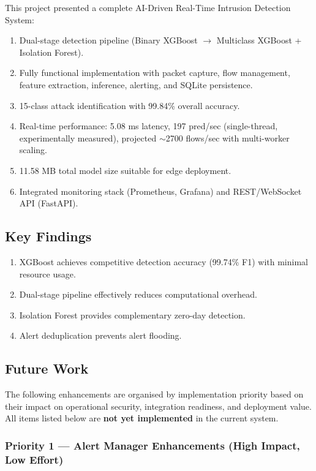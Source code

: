 \documentclass[12pt,a4paper]{article}
\begin{document}
This project presented a complete AI-Driven Real-Time Intrusion Detection System:

\begin{enumerate}
    \item Dual-stage detection pipeline (Binary XGBoost $\rightarrow$ Multiclass XGBoost + Isolation Forest).
    \item Fully functional implementation with packet capture, flow management, feature extraction, inference, alerting, and SQLite persistence.
    \item 15-class attack identification with 99.84\% overall accuracy.
    \item Real-time performance: 5.08 ms latency, 197 pred/sec (single-thread, experimentally measured), projected $\sim$2700 flows/sec with multi-worker scaling.
    \item 11.58 MB total model size suitable for edge deployment.
    \item Integrated monitoring stack (Prometheus, Grafana) and REST/WebSocket API (FastAPI).
\end{enumerate}

\subsection{Key Findings}
\begin{enumerate}
    \item XGBoost achieves competitive detection accuracy (99.74\% F1) with minimal resource usage.
    \item Dual-stage pipeline effectively reduces computational overhead.
    \item Isolation Forest provides complementary zero-day detection.
    \item Alert deduplication prevents alert flooding.
\end{enumerate}

\subsection{Future Work}
\label{sec:future_work}

The following enhancements are organised by implementation priority based on their impact on operational security, integration readiness, and deployment value. All items listed below are \textbf{not yet implemented} in the current system.

\subsubsection{Priority 1 — Alert Manager Enhancements (High Impact, Low Effort)}
\end{document}
